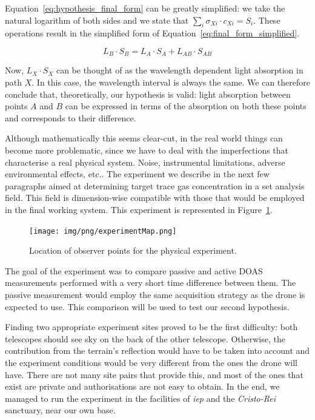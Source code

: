 Equation~\ref{eq:hypothesis_final_form} can be greatly simplified: we
take the natural logarithm of both sides and we state that $\sum_i
\sigma_{Xi} \cdot c_{Xi} = S_i$. These operations result in the
simplified form of Equation~\ref{eq:final_form_simplified}.

\begin{equation}
    \label{eq:final_form_simplified}
    L_B \cdot S_B = L_A \cdot S_A + L_{AB} \cdot S_{AB}
\end{equation}

Now, $L_X \cdot S_X$ can be thought of as the wavelength dependent light
absorption in path $X$. In this case, the wavelength interval is always
the same. We can therefore conclude that, theoretically, our
hypothesis is valid: light absorption between points $A$ and $B$ can be
expressed in terms of the absorption on both these points and
corresponds to their difference.

Although mathematically this seems clear-cut, in the real world things
can become more problematic, since we have to deal with the
imperfections that characterise a real physical system. Noise,
instrumental limitations, adverse environmental effects, etc.. The
experiment we describe in the next few paragraphs aimed at determining
target trace gas concentration in a set analysis field. This field is
dimension-wise compatible with those that would be employed in the final
working system. This experiment is represented in
Figure~\ref{fig:experiment_map}.

\begin{figure}[htpb]
    \centering
    \texttt{[image: img/png/experimentMap.png]}
    \caption{Location of observer points for the physical experiment.}
    \label{fig:experiment_map}
\end{figure}

The goal of the experiment was to compare passive and active \gls{DOAS}
measurements performed with a very short time difference between them.
The passive measurement would employ the same acquisition strategy as
the drone is expected to use. This comparison will be used to test our
second hypothesis.

Finding two appropriate experiment sites proved to be the first
difficulty: both telescopes should see sky on the back of the other
telescope. Otherwise, the contribution from the terrain's reflection
would have to be taken into account and the experiment conditions would
be very different from the ones the drone will have. There are not many
site pairs that provide this, and most of the ones that exist are
private and authorisations are not easy to obtain. In the end, we
managed to run the experiment in the facilities of \emph{\gls{iep}} and
the \emph{Cristo-Rei} sanctuary, near our own base. 

